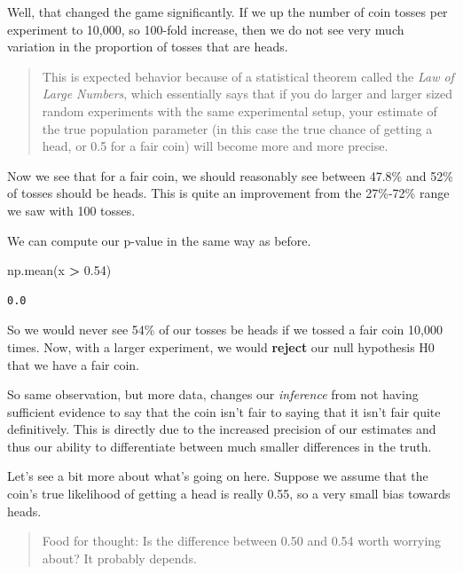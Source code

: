 \documentclass[
  letterpaper,
]{scrbook}
\newenvironment{Shaded}{\begin{snugshade}}{\end{snugshade}}
\newcommand{\FloatTok}[1]{\textcolor[rgb]{0.00,0.00,0.81}{#1}}
\newcommand{\NormalTok}[1]{#1}
\newcommand{\OperatorTok}[1]{\textcolor[rgb]{0.81,0.36,0.00}{\textbf{#1}}}
\begin{document}
Well, that changed the game significantly. If we up the number of coin tosses per experiment to 10,000, so 100-fold increase, then we do not see very much variation in the proportion of tosses that are heads.

\begin{quote}
This is expected behavior because of a statistical theorem called the \emph{Law of Large Numbers}, which essentially says that if you do larger and larger sized random experiments with the same experimental setup, your estimate of the true population parameter (in this case the true chance of getting a head, or 0.5 for a fair coin) will become more and more precise.
\end{quote}

Now we see that for a fair coin, we should reasonably see between 47.8\% and 52\% of tosses should be heads. This is quite an improvement from the 27\%-72\% range we saw with 100 tosses.

We can compute our p-value in the same way as before.

\begin{Shaded}
\begin{Highlighting}[]
\NormalTok{np.mean(x }\OperatorTok{>} \FloatTok{0.54}\NormalTok{)}
\end{Highlighting}
\end{Shaded}

\begin{verbatim}
0.0
\end{verbatim}

So we would never see 54\% of our tosses be heads if we tossed a fair coin 10,000 times. Now, with a larger experiment, we would \textbf{reject} our null hypothesis H0 that we have a fair coin.

So same observation, but more data, changes our \emph{inference} from not having sufficient evidence to say that the coin isn't fair to saying that it isn't fair quite definitively. This is directly due to the increased precision of our estimates and thus our ability to differentiate between much smaller differences in the truth.

Let's see a bit more about what's going on here. Suppose we assume that the coin's true likelihood of getting a head is really 0.55, so a very small bias towards heads.

\begin{quote}
Food for thought: Is the difference between 0.50 and 0.54 worth worrying about? It probably depends.
\end{quote}
\end{document}
